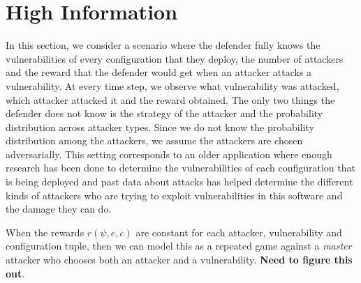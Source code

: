 \section{High Information}\label{sec:high-info}
In this section, we consider a scenario where the defender fully knows the vulnerabilities of every configuration that they deploy, the number of attackers and the reward that the defender would get when an attacker attacks a vulnerability. At every time step, we observe what vulnerability was attacked, which attacker attacked it and the reward obtained. The only two things the defender does not know is the strategy of the attacker and the probability distribution across attacker types. Since we do not know the probability distribution among the attackers, we assume the attackers are chosen adversarially. This setting corresponds to an older application where enough research has been done to determine the vulnerabilities of each configuration that is being deployed and past data about attacks has helped determine the different kinds of attackers who are trying to exploit vulnerabilities in this software and the damage they can do.

When the rewards $r(\psi, e, c)$ are constant for each attacker, vulnerability and configuration tuple, then we can model this as a repeated game against a {\em master} attacker who chooses both an attacker and a vulnerability. \textbf{Need to figure this out}.

